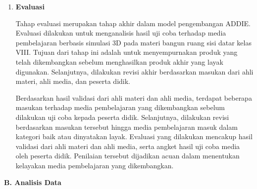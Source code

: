 \begin{enumerate}[leftmargin=1cm, label=\arabic*.]
\begin{enumerate}
        \hspace*{1cm}Hasil angket menunjukkan bahwa media pembelajaran memudahkan pemahaman materi, menarik, serta diharapkan dapat dikembangkan untuk materi lainnya. Pada tahap ini tidak terdapat saran revisi dari peserta didik, sehingga pengembangan dapat dilanjutkan ke tahap berikutnya.


        \item Uji Coba Kelas Besar \\
        \hspace*{1cm}Uji coba kelas besar dilakukan dengan melibatkan seluruh peserta didik kelas VIII-B SMP Muhammadiyah 9 Yogyakarta pada tanggal 20 Mei 2026. Pemilihan kelas tersebut didasarkan pada rekomendasi pendidik matematika karena pendidik tersebut mengampu kelas tersebut dan materi bangun ruang sedang diajarkan.

        \hspace{1cm}Pelaksanaan uji coba dilakukan melalui pembelajaran menggunakan media pembelajaran berbasis simulasi 3D. Setelah pembelajaran selesai, peserta didik diminta mengisi angket yang telah disiapkan. Angket tersebut digunakan untuk memperoleh penilaian peserta didik terhadap kualitas media pembelajaran yang dikembangkan. Peserta didik menyampaikan bahwa materi mudah dipahami dan pembelajaran menjadi tidak membosankan. Mereka juga menyarankan agar tidak terlalu banyak bacaan dan contoh soal diperbanyak.
    \end{enumerate}

    \item \textbf{Evaluasi}
    
    \hspace{1cm}Tahap evaluasi merupakan tahap akhir dalam model pengembangan ADDIE. Evaluasi dilakukan untuk menganalisis hasil uji coba terhadap media pembelajaran berbasis simulasi 3D pada materi bangun ruang sisi datar kelas VIII. Tujuan dari tahap ini adalah untuk menyempurnakan produk yang telah dikembangkan sebelum menghasilkan produk akhir yang layak digunakan. Selanjutnya, dilakukan revisi akhir berdasarkan masukan dari ahli materi, ahli media, dan peserta didik.

    \hspace{1cm}Berdasarkan hasil validasi dari ahli materi dan ahli media, terdapat beberapa masukan terhadap media pembelajaran yang dikembangkan sebelum dilakukan uji coba kepada peserta didik. Selanjutnya, dilakukan revisi berdasarkan masukan tersebut hingga media pembelajaran masuk dalam kategori baik atau dinyatakan layak. Evaluasi yang dilakukan mencakup hasil validasi dari ahli materi dan ahli media, serta angket hasil uji coba media oleh peserta didik. Penilaian tersebut dijadikan acuan dalam menentukan kelayakan media pembelajaran yang dikembangkan.

\end{enumerate}
\textbf{B. Analisis Data}

